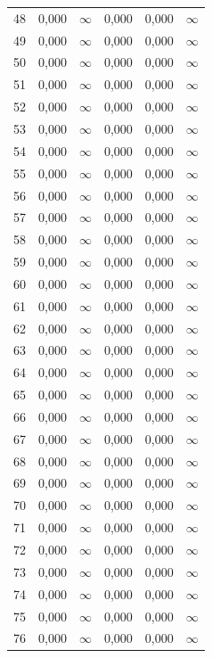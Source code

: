 \begin{tabular}{l c c c c c}
48 & 0,000 & $\infty$ & 0,000 & 0,000 & $\infty$ \\
49 & 0,000 & $\infty$ & 0,000 & 0,000 & $\infty$ \\
50 & 0,000 & $\infty$ & 0,000 & 0,000 & $\infty$ \\
51 & 0,000 & $\infty$ & 0,000 & 0,000 & $\infty$ \\
52 & 0,000 & $\infty$ & 0,000 & 0,000 & $\infty$ \\
53 & 0,000 & $\infty$ & 0,000 & 0,000 & $\infty$ \\
54 & 0,000 & $\infty$ & 0,000 & 0,000 & $\infty$ \\
55 & 0,000 & $\infty$ & 0,000 & 0,000 & $\infty$ \\
56 & 0,000 & $\infty$ & 0,000 & 0,000 & $\infty$ \\
57 & 0,000 & $\infty$ & 0,000 & 0,000 & $\infty$ \\
58 & 0,000 & $\infty$ & 0,000 & 0,000 & $\infty$ \\
59 & 0,000 & $\infty$ & 0,000 & 0,000 & $\infty$ \\
60 & 0,000 & $\infty$ & 0,000 & 0,000 & $\infty$ \\
61 & 0,000 & $\infty$ & 0,000 & 0,000 & $\infty$ \\
62 & 0,000 & $\infty$ & 0,000 & 0,000 & $\infty$ \\
63 & 0,000 & $\infty$ & 0,000 & 0,000 & $\infty$ \\
64 & 0,000 & $\infty$ & 0,000 & 0,000 & $\infty$ \\
65 & 0,000 & $\infty$ & 0,000 & 0,000 & $\infty$ \\
66 & 0,000 & $\infty$ & 0,000 & 0,000 & $\infty$ \\
67 & 0,000 & $\infty$ & 0,000 & 0,000 & $\infty$ \\
68 & 0,000 & $\infty$ & 0,000 & 0,000 & $\infty$ \\
69 & 0,000 & $\infty$ & 0,000 & 0,000 & $\infty$ \\
70 & 0,000 & $\infty$ & 0,000 & 0,000 & $\infty$ \\
71 & 0,000 & $\infty$ & 0,000 & 0,000 & $\infty$ \\
72 & 0,000 & $\infty$ & 0,000 & 0,000 & $\infty$ \\
73 & 0,000 & $\infty$ & 0,000 & 0,000 & $\infty$ \\
74 & 0,000 & $\infty$ & 0,000 & 0,000 & $\infty$ \\
75 & 0,000 & $\infty$ & 0,000 & 0,000 & $\infty$ \\
76 & 0,000 & $\infty$ & 0,000 & 0,000 & $\infty$ \\

\end{tabular}
